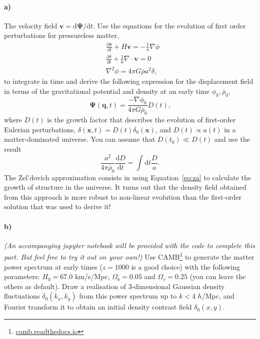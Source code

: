 \documentclass[12pt]{article}
\newcommand\diff{\mathrm{d}}
\begin{document}
\paragraph{a)} The velocity field $\mathbf{v} = \diff\mathbf{\Psi}/\diff t$. Use
the equations for the evolution of first order perturbations for pressureless
matter,
\begin{equation}
\begin{aligned}
    &\frac{\partial \mathbf{v}}{\partial t} + H \mathbf{v} = - \frac{1}{a} \nabla \phi \\
    &\frac{\partial \delta}{\partial t} + \frac{1}{a} \nabla \cdot \mathbf{v} = 0\\
    &\nabla^2 \phi = 4 \pi G \bar{\rho} a^2 \delta \text{,}
\end{aligned}
\label{eq:first-order}
\end{equation}
to integrate in time and derive the following expression for the displacement
field in terms of the gravitational potential and density at an early time
$\phi_0, \bar{\rho}_0$,
\begin{equation}
    \mathbf{\Psi}(\mathbf{q}, t) = \frac{-\nabla \phi_0}{4 \pi G \bar{\rho}_0} D(t)
    \text{,}
\label{eq:za}
\end{equation}
where $D(t)$ is the growth factor that describes the evolution of first-order
Eulerian perturbations, $\delta(\mathbf{x}, t) = D(t) \delta_0(\mathbf{x})$, and
$D(t) \propto a(t)$ in a matter-dominated universe. You can assume that $D(t_0)
\ll D(t)$ and use the result
\begin{equation}
    \frac{a^2}{4 \pi \bar{\rho}_0} \frac{\diff D}{\diff t} = \int \diff t \frac{D}{a} \text{.}
\end{equation}
The Zel'dovich approximation consists in using Equation~\ref{eq:za} to calculate
the growth of structure in the universe. It turns out that the density field
obtained from this approach is more robust to non-linear evolution than the
first-order solution that was used to derive it!

\paragraph{b)} \emph{(An accompanying jupyter notebook will be provided with the
code to complete this part. But feel free to try it out on your own!)} Use
CAMB\footnote{\url{camb.readthedocs.io}} to generate the matter power spectrum
at early times ($z=1000$ is a good choice) with the following parameters: $H_0 =
67.0$ km/s/Mpc, $\Omega_b = 0.05$ and $\Omega_c = 0.25$ (you can leave the
others as default). Draw a realisation of 3-dimensional Gaussian density
fluctuations $\delta_0(k_x, k_y)$ from this power spectrum up to $k < 4$
$h$/Mpc, and Fourier transform it to obtain an initial density contrast field
$\delta_0(x, y)$.
\end{document}

